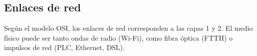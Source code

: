 \documentclass[a4paper, 11pt, twoside]{report} %
\begin{document}
\subsection{Enlaces de red}
Según el modelo OSI, los enlaces de red corresponden a las capas 1 y 2. El medio físico puede ser tanto ondas de radio (Wi-Fi), como fibra óptica (FTTH) o impulsos de red (PLC, Ethernet, DSL).

\glsaddall
\renewcommand{\glsnamefont}[1]{\makefirstuc{#1}}
\printglossary[style=mcolindex, title=Glosario y acrónimos, toctitle=Glosario y acrónimos]

\nocite{*}
\printbibliography

\listoffigures

\newpage
\thispagestyle{empty}
\vspace*{\fill}
\doclicenseThis
\vspace*{\fill}
\end{document}
